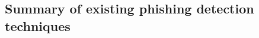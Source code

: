 
\begin{landscape}
  \thispagestyle{mylandscape}
  \subsection*{Summary of existing phishing detection techniques}
\end{landscape}

